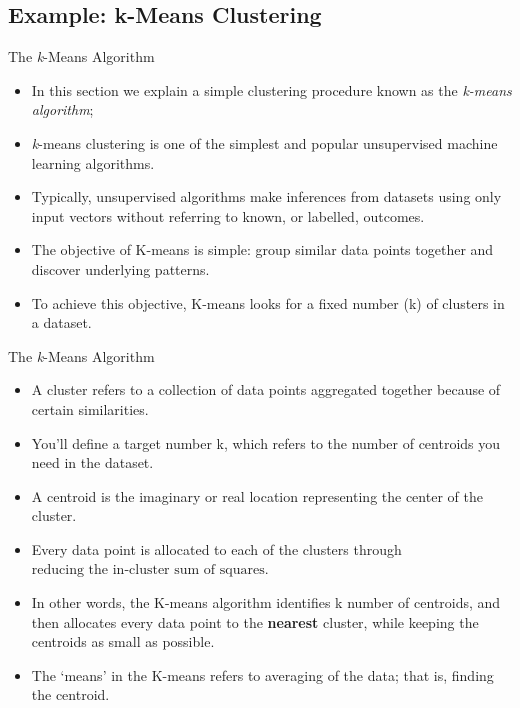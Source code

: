 \documentclass[11pt]{beamer}
\newcommand{\highlight}[1]{%
  \colorbox{yellow!100}{$\displaystyle#1$}}
\begin{document}
\subsection[subsection]{Example: k-Means Clustering}
%
\begin{frame}{The \textit{k}-Means Algorithm}
	\begin{itemize}
		\item In this section we explain a simple clustering procedure known as the 			\textit{k-means algorithm};
\item \textit{k}-means clustering is one of the simplest and popular unsupervised machine learning algorithms.

\item Typically, unsupervised algorithms make inferences from datasets using only input vectors without referring to known, or labelled, outcomes. 

\item The objective of K-means is simple: group similar data points together and discover underlying patterns. 

\item To achieve this objective, K-means looks for a fixed number (k) of clusters in a dataset.

	\end{itemize}
\end{frame}
\begin{frame}{The \textit{k}-Means Algorithm}
	\begin{itemize}
\item A cluster refers to a collection of data points aggregated together because of certain similarities. 

\item You’ll define a target number k, which refers to the number of centroids you need in the dataset. 

\item A centroid is the imaginary or real location representing the center of the cluster.

\item Every data point is allocated to each of the clusters through \highlight{\text{reducing the in-cluster sum of squares}}.

\item In other words, the K-means algorithm identifies k number of centroids, and then allocates every data point to the \textbf{nearest} cluster, while keeping the centroids as small as possible.

\item The ‘means’ in the K-means refers to averaging of the data; that is, finding the centroid.
		
	\end{itemize}
\end{frame}
\end{document}
